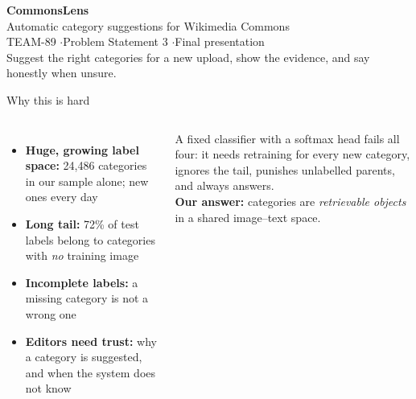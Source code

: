 \documentclass[aspectratio=169,11pt]{beamer}
\begin{document}
\begin{frame}[plain]
\vspace{30pt}
{\color{accent}\fontsize{30}{34}\selectfont\textbf{CommonsLens}}\\[8pt]
{\Large Automatic category suggestions for Wikimedia Commons}\\[22pt]
{\color{muted}TEAM-89 \quad$\cdot$\quad Problem Statement 3 \quad$\cdot$\quad Final presentation}\\[30pt]
\small Suggest the right categories for a new upload, show the evidence, and say honestly when unsure.
\end{frame}

\begin{frame}{Why this is hard}
\begin{columns}[T]
\begin{itemize}\setlength{\itemsep}{6pt}
\item \textbf{Huge, growing label space:} 24,486 categories in our sample alone; new ones every day
\item \textbf{Long tail:} 72\% of test labels belong to categories with \emph{no} training image
\item \textbf{Incomplete labels:} a missing category is not a wrong one
\item \textbf{Editors need trust:} why a category is suggested, and when the system does not know
\end{itemize}
\begin{block}{}
\small A fixed classifier with a softmax head fails all four: it needs retraining for every new
category, ignores the tail, punishes unlabelled parents, and always answers.\\[6pt]
\textbf{Our answer:} categories are \emph{retrievable objects} in a shared image--text space.
\end{block}
\end{columns}
\end{frame}
\end{document}
